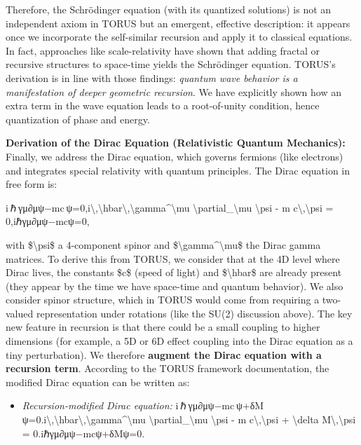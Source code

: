 Therefore, the Schrödinger equation (with its quantized solutions) is
not an independent axiom in TORUS but an emergent, effective
description: it appears once we incorporate the self-similar recursion
and apply it to classical equations​. In fact, approaches like
scale-relativity have shown that adding fractal or recursive structures
to space-time yields the Schrödinger equation​. TORUS's derivation is in
line with those findings: \emph{quantum wave behavior is a manifestation
of deeper geometric recursion}. We have explicitly shown how an extra
term in the wave equation leads to a root-of-unity condition, hence
quantization of phase and energy.

\textbf{Derivation of the Dirac Equation (Relativistic Quantum
Mechanics):} Finally, we address the Dirac equation, which governs
fermions (like electrons) and integrates special relativity with quantum
principles. The Dirac equation in free form is:

i ℏ γμ∂μψ−mc ψ=0,i\textbackslash{},\textbackslash{}hbar\textbackslash{},\textbackslash{}gamma\^{}\textbackslash{}mu
\textbackslash{}partial\_\textbackslash{}mu \textbackslash{}psi - m
c\textbackslash{},\textbackslash{}psi = 0,iℏγμ∂μ​ψ−mcψ=0,

with \$\textbackslash{}psi\$ a 4-component spinor and
\$\textbackslash{}gamma\^{}\textbackslash{}mu\$ the Dirac gamma
matrices. To derive this from TORUS, we consider that at the 4D level
where Dirac lives, the constants \$c\$ (speed of light) and
\$\textbackslash{}hbar\$ are already present (they appear by the time we
have space-time and quantum behavior). We also consider spinor
structure, which in TORUS would come from requiring a two-valued
representation under rotations (like the SU(2) discussion above). The
key new feature in recursion is that there could be a small coupling to
higher dimensions (for example, a 5D or 6D effect coupling into the
Dirac equation as a tiny perturbation). We therefore \textbf{augment the
Dirac equation with a recursion term}. According to the TORUS framework
documentation, the modified Dirac equation can be written as​:

\begin{itemize}
\item
  \emph{Recursion-modified Dirac equation:}
  i ℏ γμ∂μψ−mc ψ+δM ψ=0.i\textbackslash{},\textbackslash{}hbar\textbackslash{},\textbackslash{}gamma\^{}\textbackslash{}mu
  \textbackslash{}partial\_\textbackslash{}mu \textbackslash{}psi - m
  c\textbackslash{},\textbackslash{}psi + \textbackslash{}delta
  M\textbackslash{},\textbackslash{}psi = 0.iℏγμ∂μ​ψ−mcψ+δMψ=0.
\end{itemize}

